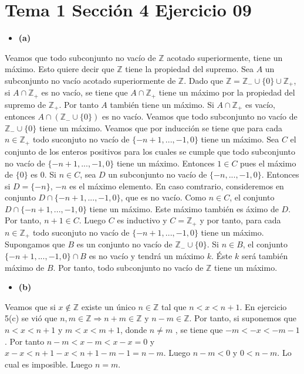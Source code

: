 \documentclass{article}
\begin{document}
\section{Tema 1 Sección 4 Ejercicio 09}
\begin{itemize}
\item \bf (a) \rm
\end{itemize}
Veamos que todo subconjunto no vacío de $\mathbb{Z}$ acotado superiormente, tiene un máximo. Esto quiere decir que $\mathbb{Z}$ tiene la propiedad del supremo.  Sea $A$ un subconjunto no vacío acotado superiormente de $\mathbb{Z}$. Dado que $\mathbb{Z}=\mathbb{Z}_{-}\cup \{0\}\cup\mathbb{Z}_{+}$, si $A\cap\mathbb{Z}_{+}$ es no vacío, se tiene que $A\cap\mathbb{Z}_{+}$ tiene un máximo por la propiedad del supremo de $\mathbb{Z}_{+}$. Por tanto $A$ también tiene un máximo.
\newline
Si $A\cap\mathbb{Z}_{+}$ es vacío, entonces $A\cap(\mathbb{Z}_{-}\cup\{0\})$ es no vacío. Veamos que todo subconjunto no vacío de $\mathbb{Z}_{-}\cup\{0\} $ tiene un máximo.
\newline
Veamos que por inducción se tiene que para cada $n\in \mathbb{Z}_{+}$ todo suconjuto no vacío de $\{-n+1, ..., -1,0\}$ tiene un máximo. Sea $C$ el conjunto de los enteros positivos para los cuales se cumple que todo subconjunto no vacío de $\{-n+1, ..., -1,0\}$ tiene un máximo. Entonces $1\in C $ pues el máximo de $\{0\}$ es 0. Si $n\in C $, sea $D$ un subconjunto no vacío de $\{-n, ..., -1,0\}$. Entonces si $D=\{-n\}$,  $-n$ es el máximo elemento. En caso comtrario, consideremos en conjunto $D\cap\{-n+1, ..., -1,0\}$, que es no vacío. Como $n\in C$, el conjunto $D\cap\{-n+1, ..., -1,0\}$ tiene un máximo. Este máximo también es áximo de $D$. Por tanto, $n+1\in C$. Luego $C$ es inductivo y $C=\mathbb{Z}_{+}$ y por tanto,  para cada $n\in \mathbb{Z}_{+}$ todo suconjuto no vacío de $\{-n+1, ..., -1,0\}$ tiene un máximo.
\newline
Supongamos que  $B$ es un conjunto no vacío de $\mathbb{Z}_{-}\cup\{0\}$. Si $n\in B$, el conjunto $\{-n+1, ..., -1,0\}\cap B$ es no vacío y tendrá un máximo $k$. Éste $k$ será también máximo de $B$.
\newline
Por tanto, todo subconjunto no vacío de $\mathbb{Z}$ tiene un máximo.
\begin{itemize}
\item \bf (b) \rm
\end{itemize}
Veamos que si $x\notin \mathbb{Z}$ existe un único $n\in \mathbb{Z}$ tal que $n<x<n+1$. En ejercicio 5(c) se vió que $n, m\in \mathbb{Z}\Rightarrow n+m\in\mathbb{Z}\text{ y }n-m\in\mathbb{Z}$. Por tanto,  si suponemos que $n<x<n+1$ y $m<x<m+1$, donde $n\neq m$ , se tiene que $-m<-x<-m-1$. Por tanto $n-m<x-m<x-x=0$ y $x-x<n+1-x<n+1-m-1=n-m$. Luego $n-m<0$ y $0<n-m$. Lo cual es imposible. Luego $n=m$.
\end{document}
